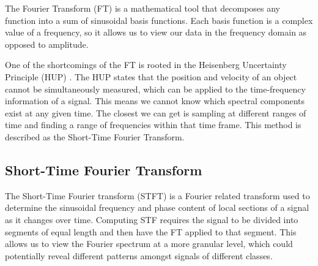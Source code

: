 \documentclass{turabian-thesis}
\begin{document}

The Fourier Transform (FT) is a mathematical tool that decomposes any function into a sum of sinusoidal basis functions. Each basis function is a complex value of a frequency, so it allows us to view our data in the frequency domain as opposed to amplitude.

One of the shortcomings of the FT is rooted in the Heisenberg Uncertainty Principle (HUP) \cite{hill_uncertainty_nodate}.  The HUP states that the position and velocity of an object cannot be simultaneously measured, which can be applied to the time-frequency information of a signal. This means we cannot know which spectral components exist at any given time. The closest we can get is sampling at different ranges of time and finding a range of frequencies within that time frame. This method is described as the Short-Time Fourier Transform.






\subsection{Short-Time Fourier Transform}
The Short-Time Fourier transform (STFT) is a Fourier related transform used to determine the sinusoidal frequency and phase content of local sections of a signal as it changes over time. \cite{hill_uncertainty_nodate}
Computing STF requires the signal to be divided into segments of equal length and then have the FT applied to that segment. This allows us to view the Fourier spectrum at a more granular level, which could potentially reveal different patterns amongst signals of different classes.
\end{document}
